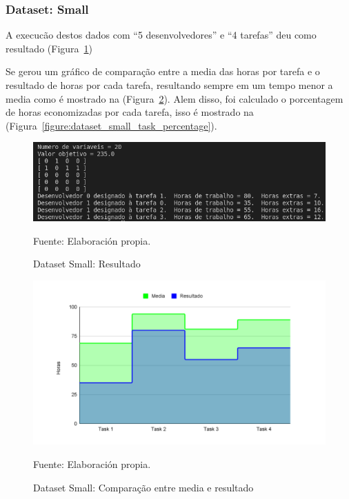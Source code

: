 \documentclass[12pt]{article}
\begin{document}
\subsubsection{Dataset: Small}

A execucão destos dados com ``5 desenvolvedores'' e ``4 tarefas'' deu como resultado (Figura~\ref{figure:dataset_small_result})

Se gerou um gráfico de comparação entre a media das horas por tarefa e o resultado de horas por cada tarefa, resultando sempre em um tempo menor a media como é mostrado na (Figura~\ref{figure:dataset_small_compare}). Alem disso, foi calculado o porcentagem de horas economizadas por cada tarefa, isso é mostrado na (Figura~\ref{figure:dataset_small_task_percentage}). 

\begin{figure}[!ht]
	\begin{center}
		\includegraphics[width=1\textwidth]{images/dataset_small_result}
	\end{center}
	\begin{center}
		\caption{\label{figure:dataset_small_result}
			\small{Dataset Small: Resultado}}
		{\small{Fuente: Elaboración propia.}}
	\end{center}
\end{figure}

\begin{figure}[!ht]
	\begin{center}
		\includegraphics[width=1\textwidth]{images/dataset_small_compare}
	\end{center}
	\begin{center}
		\caption{\label{figure:dataset_small_compare}
			\small{Dataset Small: Comparação entre media e resultado}}
		{\small{Fuente: Elaboración propia.}}
	\end{center}
\end{figure}
\end{document}
